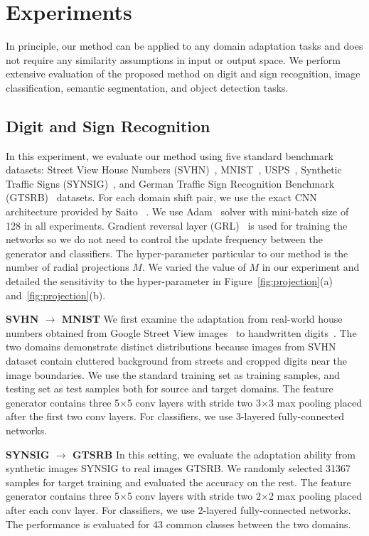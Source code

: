 \documentclass[10pt,twocolumn,letterpaper]{article}
\begin{document}
\section{Experiments}
In principle, our method can be applied to any domain adaptation tasks and does not require any similarity assumptions in input or output space. We perform extensive evaluation of the proposed method on digit and sign recognition, image classification,  semantic segmentation, and object detection tasks.

\subsection{Digit and Sign Recognition}
In this experiment, we evaluate our method using five standard benchmark datasets: Street View House Numbers (SVHN)~\cite{netzer2011reading}, MNIST~\cite{lecun1998gradient}, USPS~\cite{hull1994database}, Synthetic Traffic Signs (SYNSIG)~\cite{moiseev2013evaluation}, and German Traffic Sign Recognition Benchmark (GTSRB)~\cite{stallkamp2011german} datasets.
For each domain shift pair, we use the exact CNN architecture provided by Saito \etal~\cite{saito2017maximum}. We use Adam~\cite{kingma2014adam} solver with mini-batch size of 128 in all experiments. Gradient reversal layer (GRL)~\cite{ganin2014unsupervised} is used for training the networks so we do not need to control the update frequency between the generator and classifiers. The hyper-parameter particular to our method is the number of radial projections $M$. We varied the value of $M$ in our experiment and detailed the sensitivity to the hyper-parameter in Figure~\ref{fig:projection}(a) and~\ref{fig:projection}(b).


\vspace{2mm}
\noindent \textbf{SVHN $\rightarrow$ MNIST}
We first examine the adaptation from real-world house numbers obtained from Google Street View images~\cite{netzer2011reading} to handwritten digits~\cite{lecun1998gradient}. The two domains demonstrate distinct distributions because images from SVHN dataset contain cluttered background from streets and cropped digits near the image boundaries.
We use the standard training set as training samples, and testing set as test samples both for source and target domains. The feature generator contains three 5$\times$5 conv layers with stride two 3$\times$3 max pooling placed after the first two conv layers. For classifiers, we use 3-layered fully-connected networks. 


\vspace{2mm}
\noindent \textbf{SYNSIG $\rightarrow$ GTSRB}
In this setting, we evaluate the adaptation ability from synthetic images SYNSIG to real images GTSRB. We randomly selected 31367 samples for target training and evaluated the accuracy on the rest. The feature generator contains three 5$\times$5 conv layers with stride two 2$\times$2 max pooling placed after each conv layer. For classifiers, we use 2-layered fully-connected networks. The performance is evaluated for 43 common classes between the two domains.
\end{document}
